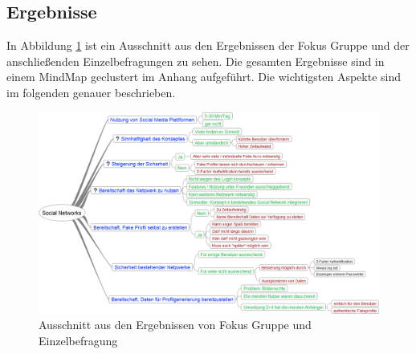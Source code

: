 \documentclass{sigchi}
\begin{document}
\subsection{Ergebnisse}
\label{Ergebnisse}
In Abbildung \ref{fig:MindMap2} ist ein Ausschnitt aus den Ergebnissen der Fokus Gruppe und der anschließenden Einzelbefragungen zu sehen. Die gesamten Ergebnisse sind in einem MindMap geclustert im Anhang aufgeführt. Die wichtigsten Aspekte sind im folgenden genauer beschrieben. 
\begin{figure}[htbp]
	\centering
	\includegraphics[width=1.5\columnwidth]{figures/Social-Networks_2.png}
	\caption{Ausschnitt aus den Ergebnissen von Fokus Gruppe und Einzelbefragung}
	\label{fig:MindMap2}
\end{figure}
\end{document}
